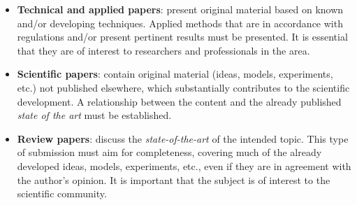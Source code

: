 \documentclass[12pt, a4paper, twoside, twocolumn]{article}
\begin{document}
\begin{itemize}[noitemsep,topsep=-1ex] \itemsep=7pt
	\item \textbf{Technical and applied papers}: present original material based on known and/or developing techniques. Applied methods that are in accordance with regulations and/or present pertinent results must be presented. It is essential that they are of interest to researchers and professionals in the area. 
	
	\item \textbf{Scientific papers}: contain original material (ideas, models, experiments, etc.) not published elsewhere, which substantially contributes to the scientific development. A relationship between the content and the already published \textit{state of the art} must be established.
	
    \item \textbf{Review papers}: discuss the \textit{state-of-the-art} of the intended topic. This type of submission must aim for completeness, covering much of the already developed ideas, models, experiments, etc., even if they are in agreement with the author's opinion. It is important that the subject is of interest to the scientific community.
\end{itemize}
\end{document}
